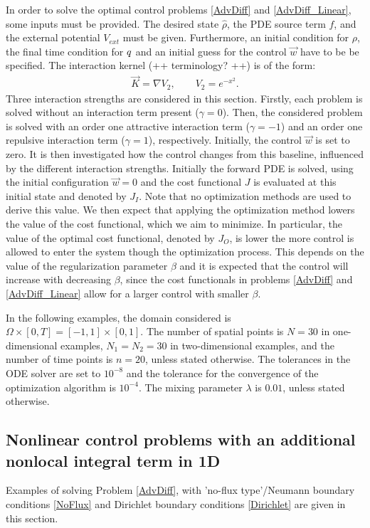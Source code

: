 
In order to solve the optimal control problems \eqref{AdvDiff} and \eqref{AdvDiff_Linear}, some inputs must be provided. The desired state $\widehat \rho$, the PDE source term $f$, and the external potential $V_{ext}$ must be given. Furthermore, an initial condition for $\rho$, the final time condition for $q$ and an initial guess for the control $\vec{w}$ have to be be specified. 
The interaction kernel (++ terminology? ++) is of the form:
\begin{align*}
\vec{K} = \nabla V_2, \qquad V_2 = e^{-x^2}.
\end{align*}
Three interaction strengths are considered in this section. Firstly, each problem is solved without an interaction term present ($\gamma = 0$). Then, the considered problem is solved with an order one attractive interaction term ($\gamma = -1$) and an order one repulsive interaction term ($\gamma = 1$), respectively. Initially, the control $\vec{w}$ is set to zero. It is then investigated how the control changes from this baseline, influenced by the different interaction strengths. 
Initially the forward PDE is solved, using the initial configuration $\vec{w}=0$ and the cost functional $J$ is evaluated at this initial state and denoted by $J_I$. Note that no optimization methods are used to derive this value. We then expect that applying the optimization method lowers the value of the cost functional, which we aim to minimize. 
In particular, the value of the optimal cost functional, denoted by $J_O$, is lower the more control is allowed to enter the system though the optimization process. 
This depends on the value of the regularization parameter $\beta$ and it is expected that the control will increase with decreasing $\beta$, since the cost functionals in problems \eqref{AdvDiff} and \eqref{AdvDiff_Linear} allow for a larger control with smaller $\beta$. 

In the following examples, the domain considered is $\Omega \times [0,T] = [-1,1] \times [0,1]$. The number of spatial points is $N=30$ in one-dimensional examples, $N_1 = N_2 = 30$ in two-dimensional examples, and the number of time points is $n=20$, unless stated otherwise. The tolerances in the ODE solver are set to $10^{-8}$ and the tolerance for the convergence of the optimization algorithm is $10^{-4}$. The mixing parameter $\lambda$ is $0.01$, unless stated otherwise.
\subsection{Nonlinear control problems with an additional nonlocal integral term in 1D} \label{sec:Examples1d}
Examples of solving Problem \eqref{AdvDiff}, with 'no-flux type'/Neumann boundary conditions \eqref{NoFlux} and Dirichlet boundary conditions \eqref{Dirichlet} are given in this section. 
 
